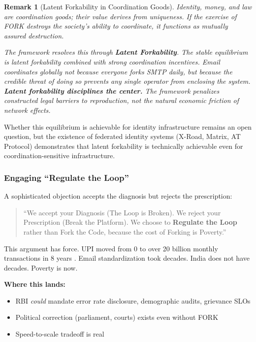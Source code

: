 \documentclass{article}
\newtheorem{remark}{Remark}
\begin{document}
\begin{remark}[Latent Forkability in Coordination Goods]
Identity, money, and law are coordination goods; their value derives from uniqueness. If the exercise of FORK destroys the society's ability to coordinate, it functions as mutually assured destruction.

The framework resolves this through \textbf{Latent Forkability}. The stable equilibrium is latent forkability combined with strong coordination incentives. Email coordinates globally not because everyone forks SMTP daily, but because the \textit{credible threat} of doing so prevents any single operator from enclosing the system. \textbf{Latent forkability disciplines the center.} The framework penalizes \textit{constructed legal barriers} to reproduction, not the \textit{natural economic friction} of network effects.
\end{remark}

Whether this equilibrium is achievable for identity infrastructure remains an open question, but the existence of federated identity systems (X-Road, Matrix, AT Protocol) demonstrates that latent forkability is technically achievable even for coordination-sensitive infrastructure.

\subsubsection{Engaging ``Regulate the Loop''}
\label{subsec:regulate}

A sophisticated objection accepts the diagnosis but rejects the prescription:

\begin{quote}
``We accept your Diagnosis (The Loop is Broken). We reject your Prescription (Break the Platform). We choose to \textbf{Regulate the Loop} rather than Fork the Code, because the cost of Forking is Poverty.''
\end{quote}

This argument has force. UPI moved from 0 to over 20 billion monthly transactions in 8 years \citep{npci2026}. Email standardization took decades. India does not have decades. Poverty is now.

\textbf{Where this lands:}
\begin{itemize}
    \item RBI \textit{could} mandate error rate disclosure, demographic audits, grievance SLOs
    \item Political correction (parliament, courts) exists even without FORK
    \item Speed-to-scale tradeoff is real
\end{itemize}
\end{document}
